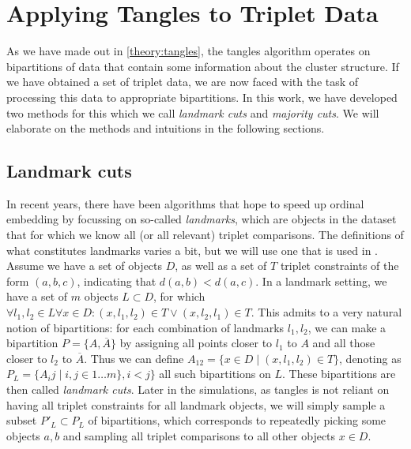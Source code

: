 \section{Applying Tangles to Triplet Data}
As we have made out in \autoref{theory:tangles}, the tangles algorithm operates on bipartitions of data that contain some information about the cluster structure.
If we have obtained a set of triplet data, we are now faced with the task of processing this data to appropriate bipartitions. In this work, we have developed two
methods for this which we call \textit{landmark cuts} and \textit{majority cuts}. We will elaborate on the methods and intuitions in the following sections.

\subsection{Landmark cuts}\label{theory:landmark_cuts}
In recent years, there have been algorithms that hope to speed up ordinal embedding by focussing on so-called \textit{landmarks}\cite{ghoshLandmarkOrdinalEmbedding2019, andertonScalingOrdinalEmbedding2019a}, which are objects in the dataset that for which we know all (or all relevant) triplet comparisons. 
The definitions of what constitutes landmarks varies a bit, but we will use one that is used in \cite{haghiriComparisonBasedFrameworkPsychophysics2019}.
Assume we have a set of objects $D$, as well as a set of $T$ triplet constraints of the form $(a,b,c)$, indicating that $d(a,b) < d(a,c)$. In a landmark setting, we have a set 
of $m$ objects $L \subset D$, for which $\forall l_1, l_2 \in L \forall x \in D: (x, l_1, l_2) \in T \vee (x, l_2, l_1) \in T$. This admits to a very natural notion of bipartitions: 
for each combination of landmarks $l_1, l_2$, we can make a bipartition $P = \{A, \overline{A}\}$ by assigning all points closer to $l_1$ to $A$ and all 
those closer to $l_2$ to $\overline{A}$. Thus we can define $A_{12} = \{ x \in D \mid \left( x, l_1, l_2 \right) \in T \}$, denoting as $P_L = \{A_ij  \mid i, j \in 1\ldots m\}, i < j\}$ 
all such bipartitions on $L$. These bipartitions are then called \textit{landmark cuts}.
Later in the simulations, as tangles is not reliant on having all triplet constraints for all landmark objects, we will simply sample a subset $P'_{L} \subset P_L$ of bipartitions,
which corresponds to repeatedly picking some objects $a, b$ and sampling all triplet comparisons to all other objects $x \in D$. \\

